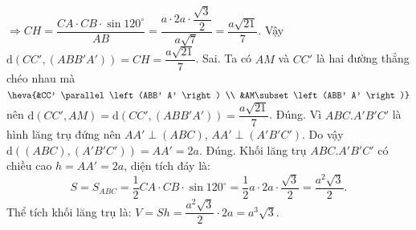 \begin{ex}
{\begin{itemchoice}
    $\Rightarrow CH=\dfrac{CA\cdot CB\cdot \sin 120^{\circ}}{AB}=\dfrac{a\cdot 2a\cdot \dfrac{\sqrt{3}}{2}}{a\sqrt{7}}=\dfrac{a\sqrt{21}}{7}$.
   Vậy $\mathrm{d}\left(CC', \left(ABB'  A' \right)\right)=CH=\dfrac{a\sqrt{21}}{7}$.
   \itemch Sai. 
   Ta có $AM$ và $CC'$ là hai đường thẳng chéo nhau mà $\heva{&CC' \parallel \left(ABB' A'  \right) \\ &AM\subset \left(ABB' A' \right)}$
   nên $\mathrm{d}\left(CC', AM\right)=\mathrm{d}\left(CC', \left(ABB' A' \right)\right)=\dfrac{a\sqrt{21}}{7}$. 
    \itemch Đúng.
   Vì $ABC. A' B' C'$ là hình lăng trụ đứng nên $AA' \perp  (ABC)$, $AA' \perp \left(A' B' C' \right)$.
   Do vậy $\mathrm{d}\left((ABC),\left(A' B' C' \right)\right)=AA'=2a$. 
    \itemch Đúng.
   Khối lăng trụ $ABC.A' B' C'$ có chiều cao $h=AA'=2a$, diện  tích đáy là:
   \[S=S_{ABC}=\dfrac{1}{2} CA\cdot CB\cdot \sin  120^{\circ}=\dfrac{1}{2} a\cdot 2a\cdot \dfrac{\sqrt{3}}{2}=\dfrac{a^2\sqrt{3}}{2}.\]
   Thể tích khối lăng trụ là:  $V=Sh=\dfrac{a^2\sqrt{3}}{2} \cdot 2a=a^3\sqrt{3}$.
  \end{itemchoice}
  }
\end{ex}

